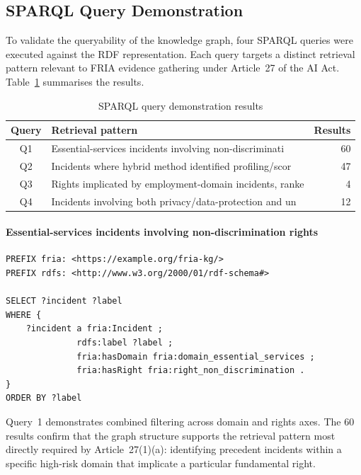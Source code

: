 \subsection{SPARQL Query Demonstration}
\label{subsec:sparql-demo}

To validate the queryability of the knowledge graph, four SPARQL queries were executed against the RDF representation. Each query targets a distinct retrieval pattern relevant to FRIA evidence gathering under Article~27 of the AI Act. Table~\ref{tab:sparql-summary} summarises the results.

\begin{table}[htbp]
\centering
\caption{SPARQL query demonstration results}
\label{tab:sparql-summary}
\begin{tabular}{clr}
\toprule
Query & Retrieval pattern & Results \\
\midrule
Q1 & Essential-services incidents involving non-discriminati & 60 \\
Q2 & Incidents where hybrid method identified profiling/scor & 47 \\
Q3 & Rights implicated by employment-domain incidents, ranke & 4 \\
Q4 & Incidents involving both privacy/data-protection and un & 12 \\
\bottomrule
\end{tabular}
\end{table}

\paragraph{Essential-services incidents involving non-discrimination rights}

\begin{lstlisting}[language=SPARQL,basicstyle=\ttfamily\footnotesize,breaklines=true,caption={Essential-services incidents involving non-discrimination rights}]
PREFIX fria: <https://example.org/fria-kg/>
PREFIX rdfs: <http://www.w3.org/2000/01/rdf-schema#>

SELECT ?incident ?label
WHERE {
    ?incident a fria:Incident ;
              rdfs:label ?label ;
              fria:hasDomain fria:domain_essential_services ;
              fria:hasRight fria:right_non_discrimination .
}
ORDER BY ?label
\end{lstlisting}

Query~1 demonstrates combined filtering across domain and rights axes. The 60 results confirm that the graph structure supports the retrieval pattern most directly required by Article~27(1)(a): identifying precedent incidents within a specific high-risk domain that implicate a particular fundamental right.

